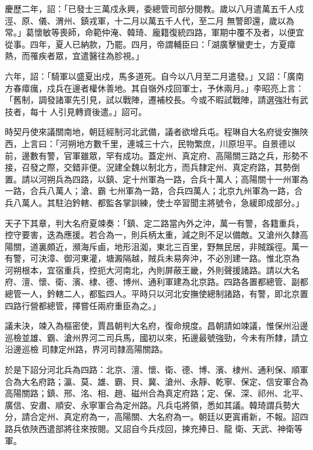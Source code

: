 \begin{pinyinscope}
 慶歷二年，詔：「已發士三萬戍永興，委總管司部分閱教。歲以八月遣萬五千人戍涇、原、儀、渭州、鎮戎軍，十二月以萬五千人代，至二月
 無警即還，歲以為常。」葛懷敏等喪師，命範仲淹、韓琦、龐籍復統四路，軍期中覆不及者，以便宜從事。四年，夏人已納款，乃罷。四月，帝謂輔臣曰：「湖廣擊蠻吏士，方夏瘴熱，而罹疾者眾，宜遣醫往為胗視。」



 六年，詔：「騎軍以盛夏出戍，馬多道死。自今以八月至二月遣發。」又詔：「廣南方春瘴癘，戍兵在邊者權休善地。其自嶺外戍回軍士，予休兩月。」李昭亮上言：「舊制，調發諸軍先引見，試以戰陣，遷補校長。今或不暇試戰陣，請選強壯有武技者，每十
 人引見轉資後遣。」詔可。



 時契丹使來議關南地，朝廷經制河北武備，議者欲增兵屯。程琳自大名府徙安撫陜西，上言曰：「河朔地方數千里，連城三十六，民物繁庶，川原坦平。自景德以前，邊數有警，官軍雖眾，罕有成功。蓋定州、真定府、高陽關三路之兵，形勢不接，召發之際，交錯非便。況建全魏以制北方，而兵隸定州、真定府路，其勢倒置。請以河朔兵為四路，以鎮、定十州軍為一路，合兵十萬人；高陽關十一州軍為一路，合兵八萬人；滄、霸
 七州軍為一路，合兵四萬人；北京九州軍為一路，合兵八萬人。其駐泊鈐轄、都監各掌訓練，使士卒習聞主將號令，急緩即成部分。」



 天子下其章，判大名府夏竦奏：「鎮、定二路當內外之沖，萬一有警，各籍重兵，控守要害，迭為應援。若合為一，則兵柄太重，減之則不足以備敵。又滄州久隸高陽關，道裏頗近，瀕海斥鹵，地形沮洳，東北三百里，野無民居，非賊蹊徑。萬一有警，可決漳、御河東灌，塘澱隔越，賊兵未易奔沖，不必別建一路。惟北京為
 河朔根本，宜宿重兵，控扼大河南北，內則屏蔽王畿，外則聲援諸路。請以大名府、澶、懷、衛、濱、棣、德、博州、通利軍建為北京路。四路各置都總管、副都總管一人，鈐轄二人，都監四人。平時只以河北安撫使總制諸路，有警，即北京置四路行營都總管，擇嘗任兩府重臣為之。」



 議未決，竦入為樞密使，賈昌朝判大名府，復命規度。昌朝請如竦議，惟保州沿邊巡檢並雄、霸、滄州界河二司兵馬，國初以來，拓邊最號強勁，今未有所隸，請立沿邊巡檢
 司隸定州路，界河司隸高陽關路。



 於是下詔分河北兵為四路：北京、澶、懷、衛、德、博、濱、棣州、通利保、順軍合為大名府路；瀛、莫、雄、霸、貝、冀、滄州、永靜、乾寧、保定、信安軍合為高陽關路；鎮、邢、洺、相、趙、磁州合為真定府路；定、保、深、祁州、北平、廣信、安肅、順安、永寧軍合為定州路。凡兵屯將領，悉如其議。韓琦謂兵勢大分，請合定州、真定府為一，高陽關、大名府為一。朝廷以更寘甫新，不報。詔四路兵依陜西遣部將往來按閱。又詔自今兵戍回，揀充捧日、龍
 衛、天武、神衛等軍。




\end{pinyinscope}
